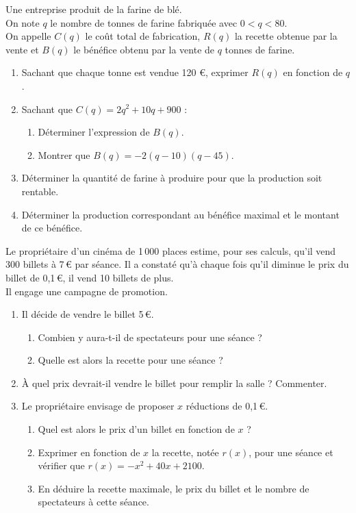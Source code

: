 \begin{multicols}{2}
\begin{prob}
Une entreprise produit de la farine de blé.\\
On note $q$ le nombre de tonnes de farine fabriquée avec $0<q<80$.\\
On appelle $C(q)$ le coût total de fabrication, $R(q)$ la recette obtenue par la vente et $B(q)$ le bénéfice obtenu par la vente de $q$ tonnes de farine.
\begin{enumerate}
	\item Sachant que chaque tonne est vendue 120 \euro, exprimer $R(q)$ en fonction de $q$.
	\item Sachant que $C(q)=2q^2+10q+900$ :
		\begin{enumerate}
			\item D\'eterminer l'expression de $B(q)$.
			\item Montrer que $B(q)= -2(q-10)(q-45)$.
		\end{enumerate}
	\item Déterminer la quantité de farine à produire pour que la production soit rentable.
	\item D\'eterminer la production correspondant au bénéfice maximal et le montant de ce bénéfice.
\end{enumerate}
\end{prob}

\begin{prob}
 Le propri\'etaire d'un cin\'ema de 1\,000 places estime, pour ses calculs, qu'il vend 300 billets \`a 7\,\euro{} par s\'eance. Il a constat\'e qu'\`a chaque fois qu'il diminue le prix du billet de 0,1\,\euro{}, il vend 10 billets de plus.\\
Il engage une campagne de promotion.
\begin{enumerate}
 \item Il d\'ecide de vendre le billet 5\,\euro{}.
	\begin{enumerate}
	 \item Combien y aura-t-il de spectateurs pour une s\'eance ?
	  \item Quelle est alors la recette pour une s\'eance ?
	\end{enumerate}
\item \`A quel prix devrait-il vendre le billet pour remplir la salle ? Commenter.
\item Le propri\'etaire envisage de proposer $x$ r\'eductions de 0,1\,\euro{}.
      \begin{enumerate}
       \item Quel est alors le prix d'un billet en fonction de $x$ ?
       \item Exprimer en fonction de $x$ la recette, not\'ee $r(x)$, pour une s\'eance et v\'erifier que $r(x)=-x^2+40x+2100$.
        \item En d\'eduire la recette maximale, le prix du billet et le nombre de spectateurs \`a cette s\'eance.
      \end{enumerate}


\end{enumerate}
\end{prob}
\end{multicols}
